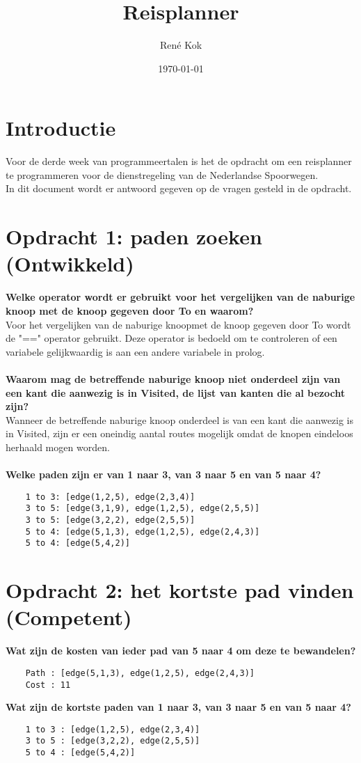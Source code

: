 \documentclass{uva-inf-article}
\title{Reisplanner}
\author{René Kok}
\date{\today}
\begin{document}
\maketitle

\section{Introductie}
Voor de derde week van programmeertalen is het de opdracht om een reisplanner te programmeren 
voor de dienstregeling van de Nederlandse Spoorwegen.\\
In dit document wordt er antwoord gegeven op de vragen gesteld in de opdracht.

\section{Opdracht 1: paden zoeken (Ontwikkeld)}
\textbf{Welke operator wordt er gebruikt voor het vergelijken van de naburige knoop met de knoop gegeven door To en waarom?}\\
Voor het vergelijken van de naburige knoopmet de knoop gegeven door To wordt de "==" operator gebruikt. 
Deze operator is bedoeld om te controleren of een variabele gelijkwaardig is aan een andere variabele in prolog.\\\\  
\textbf{Waarom mag de betreffende naburige knoop niet onderdeel zijn van een kant die aanwezig is in Visited, de lijst van kanten die al bezocht zijn?}\\
Wanneer de betreffende naburige knoop onderdeel is van een kant die aanwezig is in Visited, 
zijn er een oneindig aantal routes mogelijk omdat de knopen eindeloos herhaald mogen worden.\\\\
\textbf{Welke paden zijn er van 1 naar 3, van 3 naar 5 en van 5 naar 4?}

\begin{lstlisting}
    1 to 3: [edge(1,2,5), edge(2,3,4)]
    3 to 5: [edge(3,1,9), edge(1,2,5), edge(2,5,5)]
    3 to 5: [edge(3,2,2), edge(2,5,5)]
    5 to 4: [edge(5,1,3), edge(1,2,5), edge(2,4,3)]
    5 to 4: [edge(5,4,2)]
\end{lstlisting}

\newpage
\section{Opdracht 2: het kortste pad vinden (Competent)}
\textbf{Wat zijn de kosten van ieder pad van 5 naar 4 om deze te bewandelen?}
\begin{lstlisting}
    Path : [edge(5,1,3), edge(1,2,5), edge(2,4,3)]
    Cost : 11
\end{lstlisting}
\textbf{Wat zijn de kortste paden van 1 naar 3, van 3 naar 5 en van 5 naar 4?}
\begin{lstlisting}
    1 to 3 : [edge(1,2,5), edge(2,3,4)]
    3 to 5 : [edge(3,2,2), edge(2,5,5)]
    5 to 4 : [edge(5,4,2)]
\end{lstlisting}
\end{document}
